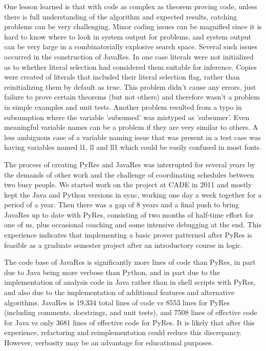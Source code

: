 \documentclass{llncs}
\begin{document}
One lesson learned is that with code as complex as theorem proving
code, unless there is full understanding of the algorithm and expected
results, catching problems can be very challenging.  Minor coding
issues can be magnified since it is hard to know where to look in
system output for problems, and system output can be very large in a
combinatorially explosive search space.  Several such issues occurred
in the construction of JavaRes.  In one case literals were not
initialized as to whether literal selection had considered them
suitable for inference.  Copies were created of literals that included
their literal selection flag, rather than reinitializing them by
default as true.  This problem didn't cause any errors, just failure
to prove certain theorems (but not others) and therefore wasn't a
problem in simple examples and unit tests.  Another problem resulted
from a typo in subsumption where the variable 'subsumed' was mistyped
as 'subsumer'.  Even meaningful variable names can be a problem if
they are very similar to others.  A less ambiguous case of a variable
naming issue that was present in a test case was having variables
named l1, ll and ll1 which could be easily confused in most fonts.

The process of creating PyRes and JavaRes was interrupted for several
years by the demands of other work and the challenge of coordinating
schedules between two busy people.  We started work on the project at
CADE in 2011 and mostly kept the Java and Python versions in sync,
working one day a week together for a period of a year.  Then there was a gap of 8 years and
a final push to bring JavaRes up to date with PyRes, consisting of two
months of half-time effort for one of us, plus occasional coaching and
some intensive debugging at the end.  This experience indicates that
implementing a basic prover patterned after PyRes is feasible as a
graduate semester project after an introductory course in logic.

The code base of JavaRes is significantly more lines of code than
PyRes, in part due to Java being more verbose than Python, and in part
due to the implementation of analysis code in Java rather than in shell
scripts with PyRes, and also due to the implementation of additional
features and alternative algorithms.  JavaRes is 19,334 total lines of code vs 8553 lines
for PyRes (including comments, docstrings, and unit tests), and 7508 lines of effective
code for Java vs only 3681 lines of effective code for PyRes.  It is likely
that after this experience, refactoring and reimplementation could reduce
this discrepancy. However, verbosity may be an advantage for educational purposes.
\end{document}
